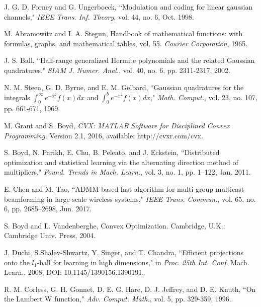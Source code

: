 \documentclass[journal]{IEEEtran}
\begin{document}
\begin{thebibliography}{1}
J. G. D. Forney and G. Ungerboeck, ``Modulation and coding for linear gaussian channels," \emph{IEEE Trans. Inf. Theory}, vol. 44, no. 6, Oct. 1998.

M. Abramowitz and I. A. Stegun, Handbook of mathematical functions: with formulas, graphs, and mathematical tables, vol. 55. \emph{Courier Corporation}, 1965.

J. S. Ball, ``Half-range generalized Hermite polynomials and the related Gaussian quadratures," \emph{SIAM J. Numer. Anal.}, vol. 40, no. 6, pp. 2311-2317, 2002.

N. M. Steen, G. D. Byrne, and E. M. Gelbard, ``Gaussian quadratures for the integrals $\int_{0}^{\infty} e^{-x^2}f\left(x\right) dx$ and $\int_{0}^{b}e^{-x^2}f\left(x\right)dx$," \emph{ Math. Comput.}, vol. 23, no. 107, pp. 661-671, 1969.

M. Grant and S. Boyd, \emph{CVX: MATLAB Software for Disciplined Convex Programming.} Version 2.1, 2016, available: http://cvxr.com/cvx.

S. Boyd, N. Parikh, E. Chu, B. Peleato, and J. Eckstein, ``Distributed optimization and statistical learning via the alternating direction method of multipliers," \emph{Found. Trends in Mach. Learn.}, vol. 3, no. 1, pp. 1–122, Jan. 2011.

E. Chen and M. Tao, ``ADMM-based fast algorithm for multi-group multicast beamforming in large-scale wireless systems," \emph{IEEE Trans. Commun.}, vol. 65, no. 6, pp. 2685–2698, Jun. 2017.

S. Boyd and L. Vandenberghe, Convex Optimization. Cambridge, U.K.: Cambridge Univ. Press, 2004.

J. Duchi, S.Shalev-Shwartz, Y. Singer, and
T. Chandra, ``Efficient projections onto
the $l_1$-ball for learning in high dimensions," in \emph{Proc. 25th Int. Conf}. Mach. Learn., 2008,
DOI: 10.1145/1390156.1390191.

R. M. Corless, G. H. Gonnet, D. E. G. Hare, D. J. Jeffrey, and D. E.
Knuth, ``On the Lambert W function," \emph{Adv. Comput. Math.}, vol. 5, pp. 329-359, 1996.
\end{thebibliography}
\end{document}
